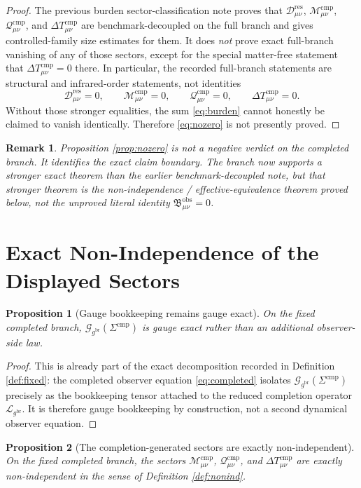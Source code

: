 \documentclass[11pt]{article}
\newcommand{\ObserverMetric}{g^{\mathrm{br}}}
\newcommand{\CompShift}{\Sigma^{\mathrm{cmp}}}
\newcommand{\ResidualDec}{\mathcal D_{\mu\nu}^{\mathrm{res}}}
\newcommand{\ReducedEin}{\mathcal L_{\ObserverMetric}}
\newcommand{\GaugeBook}{\mathcal G_{\ObserverMetric}}
\newcommand{\CompMix}{\mathcal M_{\mu\nu}^{\mathrm{cmp}}}
\newcommand{\CompQuad}{\mathcal Q_{\mu\nu}^{\mathrm{cmp}}}
\newcommand{\DeltaTComp}{\Delta T_{\mu\nu}^{\mathrm{cmp}}}
\newcommand{\ObsBurden}{\mathfrak B_{\mu\nu}^{\mathrm{obs}}}
\newtheorem{proposition}{Proposition}
\newtheorem{remark}{Remark}
\begin{document}
\begin{proof}
The previous burden sector-classification note proves that \(\ResidualDec\), \(\CompMix\), \(\CompQuad\), and \(\DeltaTComp\) are benchmark-decoupled on the full branch and gives controlled-family size estimates for them. It does \emph{not} prove exact full-branch vanishing of any of those sectors, except for the special matter-free statement that \(\DeltaTComp=0\) there. In particular, the recorded full-branch statements are structural and infrared-order statements, not identities
\[
\ResidualDec=0,
\qquad
\CompMix=0,
\qquad
\CompQuad=0,
\qquad
\DeltaTComp=0.
\]
Without those stronger equalities, the sum \eqref{eq:burden} cannot honestly be claimed to vanish identically. Therefore \eqref{eq:nozero} is not presently proved.
\end{proof}

\begin{remark}
Proposition \ref{prop:nozero} is not a negative verdict on the completed branch. It identifies the exact claim boundary. The branch now supports a stronger exact theorem than the earlier benchmark-decoupled note, but that stronger theorem is the non-independence / effective-equivalence theorem proved below, not the unproved literal identity \(\ObsBurden=0\).
\end{remark}

\section{Exact Non-Independence of the Displayed Sectors}

\begin{proposition}[Gauge bookkeeping remains gauge exact]
\label{prop:gauge}
On the fixed completed branch, \(\GaugeBook(\CompShift)\) is gauge exact rather than an additional observer-side law.
\end{proposition}

\begin{proof}
This is already part of the exact decomposition recorded in Definition \ref{def:fixed}: the completed observer equation \eqref{eq:completed} isolates \(\GaugeBook(\CompShift)\) precisely as the bookkeeping tensor attached to the reduced completion operator \(\ReducedEin\). It is therefore gauge bookkeeping by construction, not a second dynamical observer equation.
\end{proof}

\begin{proposition}[The completion-generated sectors are exactly non-independent]
\label{prop:completion}
On the fixed completed branch, the sectors \(\CompMix\), \(\CompQuad\), and \(\DeltaTComp\) are exactly non-independent in the sense of Definition \ref{def:nonind}.
\end{proposition}
\end{document}
